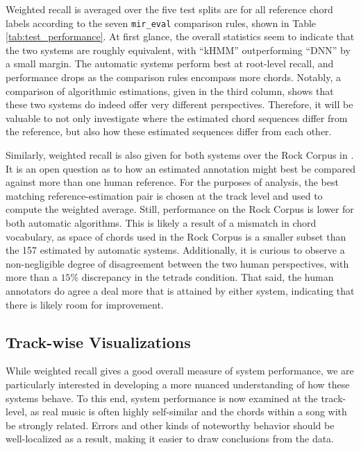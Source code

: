 \documentclass{article}
\begin{document}
Weighted recall is averaged over the five test splits are for all reference chord labels according to the seven \texttt{mir\_eval} comparison rules, shown in Table \ref{tab:test_performance}.
At first glance, the overall statistics seem to indicate that the two systems are roughly equivalent, with ``kHMM'' outperforming ``DNN'' by a small margin.
The automatic systems perform best at root-level recall, and performance drops as the comparison rules encompass more chords.
Notably, a comparison of algorithmic estimations, given in the third column, shows that these two systems do indeed offer very different perspectives.
Therefore, it will be valuable to not only investigate where the estimated chord sequences differ from the reference, but also how these estimated sequences differ from each other.

Similarly, weighted recall is also given for both systems over the Rock Corpus in .
It is an open question as to how an estimated annotation might best be compared against more than one human reference.
For the purposes of analysis, the best matching reference-estimation pair is chosen at the track level and used to compute the weighted average.
Still, performance on the Rock Corpus is lower for both automatic algorithms.
This is likely a result of a mismatch in chord vocabulary, as space of chords used in the Rock Corpus is a smaller subset than the 157 estimated by automatic systems.
Additionally, it is curious to observe a non-negligible degree of disagreement between the two human perspectives, with more than a $15\%$ discrepancy in the tetrads condition.
That said, the human annotators do agree a deal more that is attained by either system, indicating that there is likely room for improvement.


\subsection{Track-wise Visualizations}

While weighted recall gives a good overall measure of system performance, we are particularly interested in developing a more nuanced understanding of how these systems behave.
To this end, system performance is now examined at the track-level, as real music is often highly self-similar and the chords within a song with be strongly related.
Errors and other kinds of noteworthy behavior should be well-localized as a result, making it easier to draw conclusions from the data.
\end{document}
